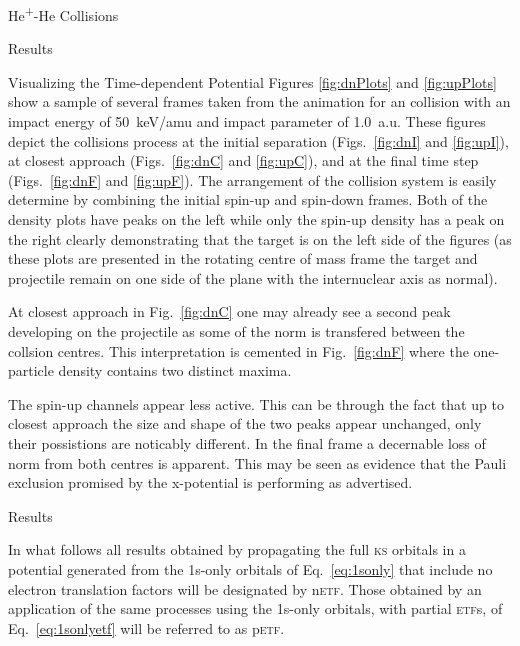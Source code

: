 \documentclass[letterpaper, 11 pt]{report}
\begin{document}
\begin{chapter}{\texorpdfstring{He\textsuperscript{+}}{He+}-He Collisions \label{chap:hephe}}
\begin{section}{Results \label{sec:hephe-disc}}
\begin{subsection}{Visualizing the Time-dependent Potential \label{sec:visual}}
         Figures \ref{fig:dnPlots} and \ref{fig:upPlots} show a sample of several frames taken from the
         animation for an collision with an impact energy of 50~keV/amu and impact parameter of 1.0~a.u.
         These figures depict the collisions process at the initial separation (Figs.~\ref{fig:dnI} and
         \ref{fig:upI}), at closest approach (Figs.~\ref{fig:dnC} and \ref{fig:upC}), and at the final
         time step (Figs.~\ref{fig:dnF} and \ref{fig:upF}). The arrangement of the collision system is
         easily determine by combining the initial spin-up and spin-down frames. Both of the density
         plots have peaks on the left while only the spin-up density has a peak on the right clearly
         demonstrating that the target is on the left side of the figures (as these plots are presented
         in the rotating centre of mass frame the target and projectile remain on one side of the plane
         with the internuclear axis as normal).

         At closest approach in Fig.~\ref{fig:dnC} one may already see a
         second peak developing on the projectile as some of the norm is transfered between the collsion
         centres. This interpretation is cemented in Fig.~\ref{fig:dnF} where the one-particle density
         contains two distinct maxima.

         The spin-up channels appear less active. This can be through the fact that up to closest
         approach the size and shape of the two peaks appear unchanged, only their possistions are
         noticably different. In the final frame a decernable loss of norm from both centres is
         apparent. This may be seen as evidence that the Pauli exclusion promised by the x-potential is
         performing as advertised.

         \FloatBarrier

      \end{subsection}

      \begin{subsection}{Results \label{sec:hephe-res}}

         In what follows all results obtained by propagating the full \textsc{ks} orbitals in a
         potential generated from the 1s-only orbitals of Eq.~\eqref{eq:1sonly} that include no electron
         translation factors will be designated by n\textsc{etf}. Those obtained by an application of
         the same processes using the 1s-only orbitals, with partial \textsc{etf}s, of
         Eq.~\eqref{eq:1sonlyetf} will be referred to as p\textsc{etf}.


\end{subsection}
\end{section}
\end{chapter}
\end{document}
